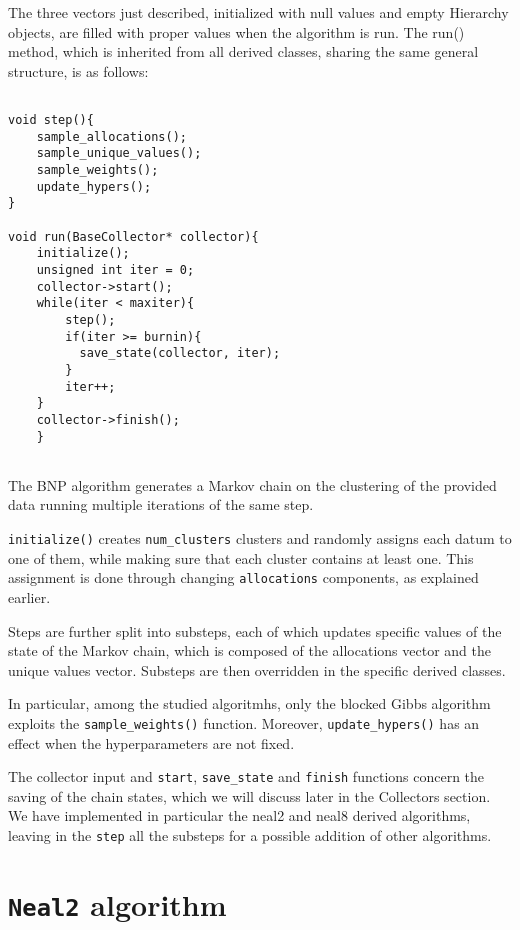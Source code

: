 The three vectors just described, initialized with null values and empty Hierarchy objects, are filled with proper values when the algorithm is run.
The run() method, which is inherited from all derived classes, sharing the same general structure, is as follows:

\begin{verbatim}

void step(){
    sample_allocations();
    sample_unique_values();
    sample_weights();
    update_hypers();
}

void run(BaseCollector* collector){
    initialize();
    unsigned int iter = 0;
    collector->start();
    while(iter < maxiter){
        step();
        if(iter >= burnin){
          save_state(collector, iter);
        }
        iter++;
    }
    collector->finish();
    }
    
\end{verbatim}

The BNP algorithm generates a Markov chain on the clustering of the provided data running multiple iterations of the same step.

\verb|initialize()| creates \verb|num_clusters| clusters and randomly assigns each datum to one of them, while making sure that each cluster contains at least one.
	This assignment is done through changing \verb|allocations| components, as explained earlier.

Steps are further split into substeps, each of which updates specific values of the state of the Markov chain, which is composed of the allocations vector and the unique values vector. Substeps are then overridden in the specific derived classes.

In particular, among the studied algoritmhs, only the blocked Gibbs algorithm exploits the \verb|sample_weights()| function. Moreover, \verb|update_hypers()| has an effect  when the hyperparameters are not fixed.

The collector input and \verb|start|, \verb|save_state| and \verb|finish| functions concern the saving of the chain states, which we will discuss later in the Collectors section.
We have implemented in particular the neal2 and neal8 derived algorithms, leaving in the \verb|step| all the substeps for a possible addition of other algorithms.




\section{\texttt{Neal2} algorithm}

